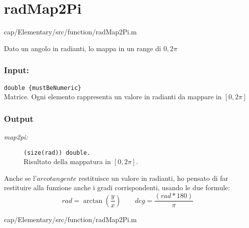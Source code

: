\section{radMap2Pi}\label{fnc:radMap2Pi}


{cap/Elementary/src/function/radMap2Pi.m}

Dato un angolo in radianti, lo mappa in un range di ${0, 2\pi}$ 

\subsubsection{Input:}
\begin{tcolorbox}
    \begin{description}
\setlength{\itemindent}{-.2in}
        
        \item[\textit{rad:}] \verb|double {mustBeNumeric}|\\
        Matrice. Ogni elemento rappresenta un valore in radianti 
        da mappare in $[0,2\pi]$
    \end{description}
\end{tcolorbox}

\subsubsection{Output}
\begin{tcolorbox}
    \begin{description}        
        \item[\textit{map2pi:}] \verb|(size(rad)) double.|\\
        Risultato della mappatura in $[0,2\pi]$.       
    \end{description}  
\end{tcolorbox}

{}

Anche se l'$arcotangente$ restituisce un valore in radianti, ho pensato di far 
restituire alla funzione anche i gradi corrispondenti, usando le due formule:
$$ rad = \arctan\left( \frac{y}{x} \right) \qquad
deg = \frac{\left( rad*180\right) }{\pi}$$


{cap/Elementary/src/function/radMap2Pi.m}
\pagebreak


